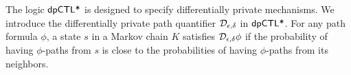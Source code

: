 
The logic $\textsf{dpCTL*}$ is designed to specify differentially private
mechanisms. We introduce the differentially private path quantifier
$\mathcal{D}_{{\epsilon}, {\delta}}$ in $\textsf{dpCTL*}$. For any path formula
$\phi$, a state $s$ in a Markov chain $K$ satisfies
$\mathcal{D}_{{\epsilon}, {\delta}} \phi$ if the probability of having $\phi$-paths
from $s$ is close to the probabilities of
having $\phi$-paths from its neighbors.


